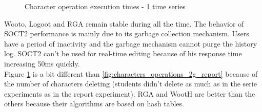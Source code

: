 \begin{figure}[h!]
\begin{minipage}{.50\linewidth}
  \caption{Character operation execution times - 1 time
series}
  \label{fig:characters_operations_1t_big}
\end{minipage} \hfill
\end{figure}

Wooto, Logoot and RGA remain stable during all the time. The behavior of SOCT2 performance is mainly due to its garbage collection mechanism. Users have a period of inactivity and the garbage mechanism cannot purge the history log. SOCT2 can't be used for real-time editing because of his response time increasing 50ms quickly.\\

Figure \ref{fig:characters_operations_1t_big} is a bit different than \ref{fig:characters_operations_2g_report} because of the number of characters deleting (students didn't delete as much as in the serie experiments as in the report experiment). RGA and WootH are better than the others because their algorithms are based on hash tables.\\


